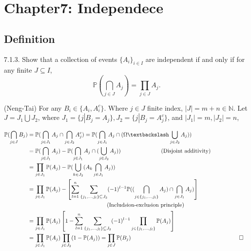 \section{Chapter7: Independece}

\subsection{Definition}

\begin{exercise}\label{7.1.3}
7.1.3. Show that a collection of events $\{ A_i\}_{i \in I}$ are independent if and only if for any finite $J \subseteq I$,
$$
    \mathbb{P}(\bigcap_{j \in J} A_j)  = \prod_{j \in J} A_j. 
$$
\end{exercise}
\begin{answer} (Neng-Tai)
    For any $B_i \in \{ A_i, A_i^c\}$. Where $j \in J$ finite index, $|J| = m+n \in \mathbb{N}$. Let $J = J_1 \bigcup J_2$, where $J_1 = \{ j | B_j = A_j\}, J_2 = \{ j| B_j = A_j^c\}$, and $|J_1| = m, |J_2| = n$, 
    
    \begin{equation*}
        \begin{aligned}
            \mathbb{P}(\bigcap_{j \in J} B_j) &= \mathbb{P}(\bigcap_{j \in J_1} A_j \cap \bigcap_{j \in J_2} A_j^c) = \mathbb{P}(\bigcap_{j \in J_1} A_j \cap (\Omega \textbackslash \bigcup_{j \in J_2}A_j)) 
            \\ &= \mathbb{P}(\bigcap_{j \in J_1} A_j) - \mathbb{P}(\bigcap_{j \in J_1} A_j \cap(\bigcup_{j \in J_2}A_j )) \hspace{2.5cm} \text{(Disjoint additivity)} 
            \\ &= \prod_{j \in J_1} \mathbb{P}(A_j) - \mathbb{P}(\bigcup_{k \in J_2} (A_k \bigcap_{j \in J_1} A_j))
            \\ & = \prod_{j \in J_1} \mathbb{P}(A_j) - \left[ \sum\limits_{l = 1}^n \sum\limits_{ \{ j_1,\dots, j_l \} \subseteq J_2} (-1)^{l-1}\mathbb{P}((\bigcap_{j \in  \{ j_1,\dots, j_l \}} A_j) \cap \bigcap_{j \in J_1} A_j) \right]  \\&\qquad \qquad \qquad \qquad \qquad \qquad \qquad  \text{(Includsion-exclusion principle)}
            \\ &= \prod_{j \in J_1} \mathbb{P}(A_j) \left[ 1 - \sum\limits_{l = 1}^n \sum\limits_{ \{ j_1,\dots, j_l \} \subseteq J_2} (-1)^{l-1}\prod_{j \in  \{ j_1,\dots, j_l \}}\mathbb{P}(A_j)  \right]  
            \\ &= \prod_{j \in J_1} \mathbb{P}(A_j) \prod_{j \in J_2} (1 - \mathbb{P}(A_j)) = \prod_{j \in J} \mathbb{P}(B_j)  && 
        \qquad \qed
        \end{aligned}
    \end{equation*}
\end{answer}
